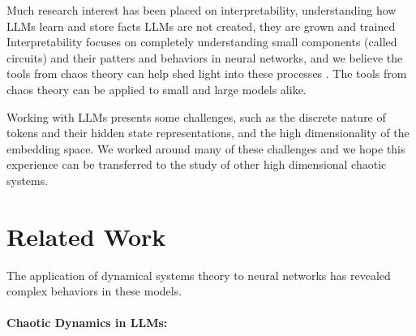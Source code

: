 \documentclass[a4paper,12pt]{article}
\begin{document}
Much research interest has been placed on interpretability, understanding how LLMs learn and store facts
LLMs are not created, they are grown and trained
Interpretability focuses on completely understanding small components (called circuits) and their patters and behaviors in neural networks, and we believe the tools from chaos theory can help shed light into these processes \cite{olah2020zoom} \cite{ameisen2025circuit} \cite{lindsey2025biology}. The tools from chaos theory can be applied to small and large models alike. %

Working with LLMs presents some challenges, such as the discrete nature of tokens and their hidden state representations, and the high dimensionality of the embedding space. 
We worked around many of these challenges and we hope this experience can be transferred to the study of other high dimensional chaotic systems.

\section{Related Work} 
\label{sec:related_work}

The application of dynamical systems theory to neural networks has revealed complex behaviors in these models. 

\paragraph{Chaotic Dynamics in LLMs:}
\end{document}
